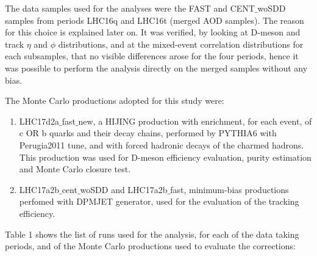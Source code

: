 The data samples used for the analyses were the FAST and CENT$\_$woSDD samples from periods LHC16q and LHC16t (merged AOD samples). The reason for this choice is explained later on. It was verified, by looking at D-meson and track $\eta$ and $\phi$ distributions, and at the mixed-event correlation distributions for each subsamples, that no visible differences arose for the four periods, hence it was possible to perform the analysis directly on the merged samples without any bias.

The Monte Carlo productions adopted for this study were:
 \begin{enumerate}
 \item LHC17d2a$\_$fast$\_$new, a HIJING production with enrichment, for each event, of c OR b quarks and their decay chains, performed by PYTHIA6 with Perugia2011 tune, and with forced hadronic decays of the charmed hadrons. This production was used for D-meson efficiency evaluation, purity estimation and Monte Carlo closure test.
 \item LHC17a2b$\_$cent$\_$woSDD and LHC17a2b$\_$fast, minimum-bias productions perfomed with DPMJET generator, used for the evaluation of the tracking efficiency.
\end{enumerate}

Table 1 shows the list of runs used for the analysis, for each of the data taking periods, and of the Monte Carlo productions used to evaluate the corrections:

